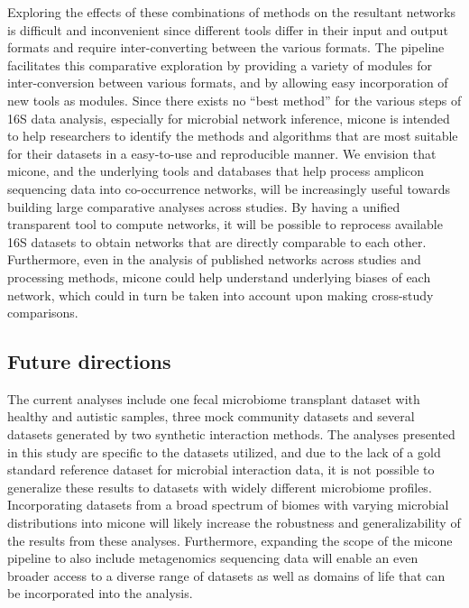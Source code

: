   Exploring the effects of these combinations of methods on the resultant networks is difficult and inconvenient since different tools differ in their input and output formats and require inter-converting between the various formats.
  The pipeline facilitates this comparative exploration by providing a variety of modules for inter-conversion between various formats, and by allowing easy incorporation of new tools as modules.
  Since there exists no ``best method'' for the various steps of 16S data analysis, especially for microbial network inference, \ac{micone} is intended to help researchers to identify the methods and algorithms that are most suitable for their datasets in a easy-to-use and reproducible manner.
  We envision that \ac{micone}, and the underlying tools and databases that help process amplicon sequencing data into co-occurrence networks, will be increasingly useful towards building large comparative analyses across studies.
  By having a unified transparent tool to compute networks, it will be possible to reprocess available 16S datasets to obtain networks that are directly comparable to each other.
  Furthermore, even in the analysis of published networks across studies and processing methods, \ac{micone} could help understand underlying biases of each network, which could in turn be taken into account upon making cross-study comparisons.

  \subsection*{Future directions}

  The current analyses include one fecal microbiome transplant dataset with healthy and autistic samples, three mock community datasets and several datasets generated by two synthetic interaction methods.
  The analyses presented in this study are specific to the datasets utilized, and due to the lack of a gold standard reference dataset for microbial interaction data, it is not possible to generalize these results to datasets with widely different microbiome profiles.
  Incorporating datasets from a broad spectrum of biomes with varying microbial distributions into \ac{micone} will likely increase the robustness and generalizability of the results from these analyses.
  Furthermore, expanding the scope of the \ac{micone} pipeline to also include metagenomics sequencing data will enable an even broader access to a diverse range of datasets as well as domains of life that can be incorporated into the analysis.

